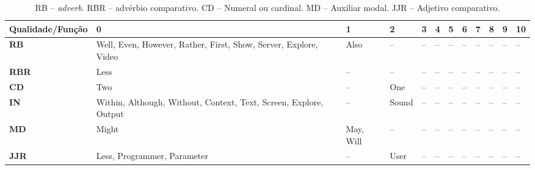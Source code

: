 \begin{table}
\centering
\caption{RB -- \emph{adverb}. RBR -- advérbio comparativo. CD -- Numeral ou cardinal. MD -- Auxiliar modal. JJR -- Adjetivo comparativo. }
\label{tab:gen5}
\small
\begin{tabular}{ | p{2.6cm} | p{2.6cm} | p{1.75cm} | p{1.75cm} | p{0.25cm} | p{0.25cm} | p{0.25cm} | p{1cm} | p{0.25cm} | p{0.25cm} | p{0.25cm} | p{0.25cm} |}
\hline
\hline
\tiny \textbf{Qualidade/Função}
 & \textbf{0}
 & \textbf{1}
 & \textbf{2}
 & \textbf{3}
 & \textbf{4}
 & \textbf{5}
 & \textbf{6}
 & \textbf{7}
 & \textbf{8}
 & \textbf{9}
 & \textbf{10} \\ 
\hline
\hline
 \tiny \textbf{RB} & \tiny Well, Even, However, Rather, First, Show, Server, Explore, Video  & \tiny Also  & \tiny --  & \tiny --  & \tiny --  & \tiny --  & \tiny --  & \tiny --  & \tiny --  & \tiny --  & \tiny -- \\
 \hline
\tiny \textbf{RBR}
 & \tiny Less  & \tiny --  & \tiny --  & \tiny --  & \tiny --  & \tiny --  & \tiny --  & \tiny --  & \tiny --  & \tiny --  & \tiny -- \\
 \hline
\tiny \textbf{CD}
 & \tiny Two  & \tiny --  & \tiny One  & \tiny --  & \tiny --  & \tiny --  & \tiny --  & \tiny --  & \tiny --  & \tiny --  & \tiny -- \\
 \hline
\tiny \textbf{IN}
 & \tiny Within, Although, Without, Context, Text, Screen, Explore, Output  & \tiny --  & \tiny Sound  & \tiny --  & \tiny --  & \tiny --  & \tiny --  & \tiny --  & \tiny --  & \tiny --  & \tiny -- \\
 \hline
\tiny \textbf{MD}
 & \tiny Might  & \tiny May, Will  & \tiny --  & \tiny --  & \tiny --  & \tiny --  & \tiny --  & \tiny --  & \tiny --  & \tiny --  & \tiny -- \\
 \hline
\tiny \textbf{JJR}
 & \tiny Less, Programmer, Parameter  & \tiny --  & \tiny User  & \tiny --  & \tiny --  & \tiny --  & \tiny --  & \tiny --  & \tiny --  & \tiny --  & \tiny -- \\
 \hline

\hline
\end{tabular}
\end{table}
